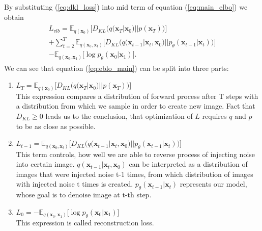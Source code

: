 \documentclass[10pt]{article}
\begin{document}
By substituting (\ref{eq:dkl_loss})  into mid term of equation (\ref{eq:main_elbo}) we obtain
\begin{gather}
\begin{gathered} \label{eq:eblo_main}
     L_{vlb} = \mathbb{E}_{q(\textbf{x}_{0})}
     \Bigg[ D_{KL}\big( q( \textbf{x}_{T}|  \textbf{x}_{0})|| p( \textbf{x}_{T}) \big)  \Bigg] \\
     + \sum_{t=2}^{T}\mathbb{E}_{q(\textbf{x}_{0}, \textbf{x}_{t})}
       \Bigg[ D_{KL}\big( q( \textbf{x}_{t-1}|  \textbf{x}_{t},  \textbf{x}_{0})|| p_{\theta}( \textbf{x}_{t-1} | \textbf{x}_{t} ) \big)  \Bigg] \\
        - \mathbb{E}_{q(\textbf{x}_{0}, \textbf{x}_{1})} 
    \Bigg[\log  p_{\theta}( \textbf{x}_{0}|  \textbf{x}_{1}  )    \Bigg].
\end{gathered}
\end{gather}
We can see that equation (\ref{eq:eblo_main}) can be split into three parts:
\begin{enumerate}
    \item $L_{T} = \mathbb{E}_{q(\textbf{x}_{0})} 
     \Bigg[ D_{KL}\big( q( \textbf{x}_{T}|  \textbf{x}_{0})|| p( \textbf{x}_{T}) \big)  \Bigg]$\\
     This expression compares a distribution of forward process after T steps with a distribution from which we sample in order to create new image. 
     Fact that $D_{KL} \geq 0$ leads us to the conclusion, that optimization of $L$ requires   $q$ and $p$ to be as close as possible.
    \item $ L_{t-1} = \mathbb{E}_{q(\textbf{x}_{0}, \textbf{x}_{t})}
       \Bigg[ D_{KL}\big( q( \textbf{x}_{t-1}|  \textbf{x}_{t},  \textbf{x}_{0})|| p_{\theta}( \textbf{x}_{t-1} | \textbf{x}_{t} ) \big)  \Bigg]$\\
       This term controls, how well we are able to reverse process of injecting noise into certain image. $q( \textbf{x}_{t-1}|  \textbf{x}_{t},  \textbf{x}_{0})$ can be interpreted as a distribution of images that were injected noise t-1 times, from which distribution of images with injected noise t times is created. $p_{\theta}( \textbf{x}_{t-1} | \textbf{x}_{t} )$ represents our model,  whose goal is to denoise image at t-th step. 
    \item  $ L_{0} = -\mathbb{E}_{q(\textbf{x}_{0}, \textbf{x}_{1})} 
    \Bigg[\log  p_{\theta}( \textbf{x}_{0}|  \textbf{x}_{1}  )    \Bigg] $ \\
    This expression is called reconstruction loss.
\end{enumerate}
\end{document}
